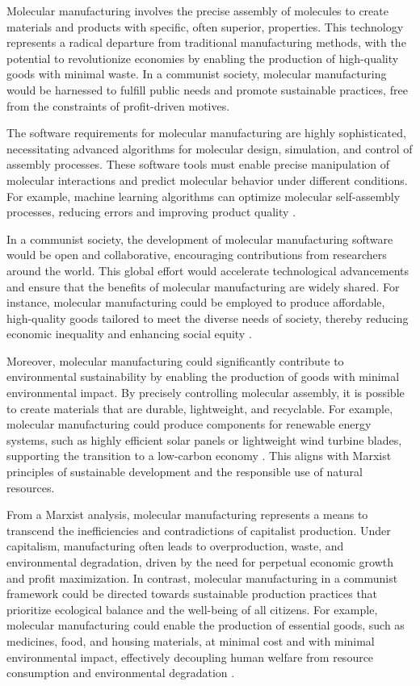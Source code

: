 Molecular manufacturing involves the precise assembly of molecules to create materials and products with specific, often superior, properties. This technology represents a radical departure from traditional manufacturing methods, with the potential to revolutionize economies by enabling the production of high-quality goods with minimal waste. In a communist society, molecular manufacturing would be harnessed to fulfill public needs and promote sustainable practices, free from the constraints of profit-driven motives.

The software requirements for molecular manufacturing are highly sophisticated, necessitating advanced algorithms for molecular design, simulation, and control of assembly processes. These software tools must enable precise manipulation of molecular interactions and predict molecular behavior under different conditions. For example, machine learning algorithms can optimize molecular self-assembly processes, reducing errors and improving product quality \cite[pp.~215-220]{freitas2005nanomedicine}.

In a communist society, the development of molecular manufacturing software would be open and collaborative, encouraging contributions from researchers around the world. This global effort would accelerate technological advancements and ensure that the benefits of molecular manufacturing are widely shared. For instance, molecular manufacturing could be employed to produce affordable, high-quality goods tailored to meet the diverse needs of society, thereby reducing economic inequality and enhancing social equity \cite[pp.~98-105]{drexler1986engines}.

Moreover, molecular manufacturing could significantly contribute to environmental sustainability by enabling the production of goods with minimal environmental impact. By precisely controlling molecular assembly, it is possible to create materials that are durable, lightweight, and recyclable. For example, molecular manufacturing could produce components for renewable energy systems, such as highly efficient solar panels or lightweight wind turbine blades, supporting the transition to a low-carbon economy \cite[pp.~310-315]{ratner2003nanotechnology}. This aligns with Marxist principles of sustainable development and the responsible use of natural resources.

From a Marxist analysis, molecular manufacturing represents a means to transcend the inefficiencies and contradictions of capitalist production. Under capitalism, manufacturing often leads to overproduction, waste, and environmental degradation, driven by the need for perpetual economic growth and profit maximization. In contrast, molecular manufacturing in a communist framework could be directed towards sustainable production practices that prioritize ecological balance and the well-being of all citizens. For example, molecular manufacturing could enable the production of essential goods, such as medicines, food, and housing materials, at minimal cost and with minimal environmental impact, effectively decoupling human welfare from resource consumption and environmental degradation \cite[pp.~78-85]{drexler1986engines}.

